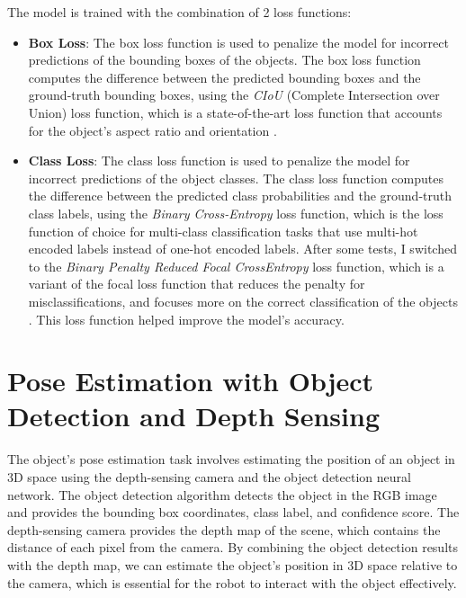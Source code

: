 The model is trained with the combination of 2 loss functions:

\begin{itemize}
    \item \textbf{Box Loss}: The box loss function is used to penalize the model for incorrect predictions of the bounding
    boxes of the objects. The box loss function computes the difference between the predicted bounding boxes and the
    ground-truth bounding boxes, using the \textit{CIoU} (Complete Intersection over Union) loss function, which is a
    state-of-the-art loss function that accounts for the object's aspect ratio and orientation \cite{zheng2021ciou}.
    \item \textbf{Class Loss}: The class loss function is used to penalize the model for incorrect predictions of the
    object classes. The class loss function computes the difference between the predicted class probabilities and the
    ground-truth class labels, using the \textit{Binary Cross-Entropy} loss function, which is the loss function of
    choice for multi-class classification tasks that use multi-hot encoded labels instead of one-hot encoded labels.
    After some tests, I switched to the \textit{Binary Penalty Reduced Focal CrossEntropy} loss function, which is a variant
    of the focal loss function that reduces the penalty for misclassifications, and focuses more on the correct
    classification of the objects \cite{law2019cornernet}. This loss function helped improve the model's accuracy.
\end{itemize}

\section{Pose Estimation with Object Detection and Depth Sensing}

The object's pose estimation task involves estimating the position of an object in 3D space using the depth-sensing
camera and the object detection neural network. The object detection algorithm detects the object 
in the RGB image and provides the bounding box coordinates, class label, and confidence score. 
The depth-sensing camera provides the depth map of the scene, which contains the distance of each pixel from the camera.
By combining the object detection results with the depth map, we can estimate the object's position in 3D space
relative to the camera, which is essential for the robot to interact with the object effectively.

